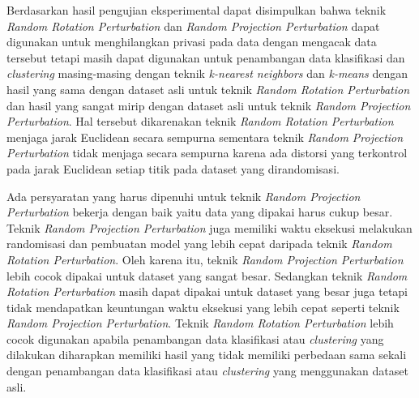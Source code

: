 Berdasarkan hasil pengujian eksperimental dapat disimpulkan bahwa teknik \textit{Random Rotation Perturbation} dan \textit{Random Projection Perturbation} dapat digunakan untuk menghilangkan privasi pada data dengan mengacak data tersebut tetapi masih dapat digunakan untuk penambangan data klasifikasi dan \textit{clustering} masing-masing dengan teknik \textit{k-nearest neighbors} dan \textit{k-means} dengan hasil yang sama dengan dataset asli untuk teknik \textit{Random Rotation Perturbation} dan hasil yang sangat mirip dengan dataset asli untuk teknik \textit{Random Projection Perturbation}. Hal tersebut dikarenakan teknik \textit{Random Rotation Perturbation} menjaga jarak Euclidean secara sempurna sementara teknik \textit{Random Projection Perturbation} tidak menjaga secara sempurna karena ada distorsi yang terkontrol pada jarak Euclidean setiap titik pada dataset yang dirandomisasi. 

Ada persyaratan yang harus dipenuhi untuk teknik \textit{Random Projection Perturbation} bekerja dengan baik yaitu data yang dipakai harus cukup besar. Teknik \textit{Random Projection Perturbation} juga memiliki waktu eksekusi melakukan randomisasi dan pembuatan model yang lebih cepat daripada teknik \textit{Random Rotation Perturbation}. Oleh karena itu, teknik \textit{Random Projection Perturbation} lebih cocok dipakai untuk dataset yang sangat besar. Sedangkan teknik \textit{Random Rotation Perturbation} masih dapat dipakai untuk dataset yang besar juga tetapi tidak mendapatkan keuntungan waktu eksekusi yang lebih cepat seperti teknik \textit{Random Projection Perturbation}. Teknik \textit{Random Rotation Perturbation} lebih cocok digunakan apabila penambangan data klasifikasi atau \textit{clustering} yang dilakukan diharapkan memiliki hasil yang tidak memiliki perbedaan sama sekali dengan penambangan data klasifikasi atau \textit{clustering} yang menggunakan dataset asli. 